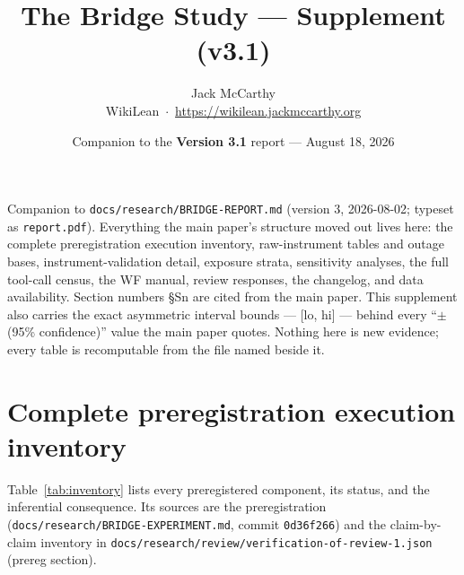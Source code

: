 \documentclass[10pt]{article}
\title{\textbf{The Bridge Study --- Supplement (v3.1)}}
\author{Jack McCarthy\\
\normalsize WikiLean \,$\cdot$\, \url{https://wikilean.jackmccarthy.org}}
\date{Companion to the \textbf{Version 3.1} report --- August 18, 2026}
\newcommand{\code}[1]{\texttt{#1}}
\begin{document}
\maketitle

\begin{center}
\begin{minipage}{0.92\textwidth}
\small
Companion to \code{docs/research/BRIDGE-REPORT.md} (version 3,
2026-08-02; typeset as \code{report.pdf}). Everything the main paper's
structure moved out lives here: the complete preregistration execution
inventory, raw-instrument tables and outage bases,
instrument-validation detail, exposure strata, sensitivity analyses,
the full tool-call census, the WF manual, review responses, the
changelog, and data availability. Section numbers \S Sn are cited from
the main paper. This supplement also carries the exact asymmetric
interval bounds --- [lo, hi] --- behind every ``$\pm$ (95\%
confidence)'' value the main paper quotes. Nothing here is new
evidence; every table is recomputable from the file named beside it.
\end{minipage}
\end{center}

\section{Complete preregistration execution inventory}\label{s1}

Table~\ref{tab:inventory} lists every preregistered component, its
status, and the inferential consequence. Its sources are the
preregistration (\code{docs/research/BRIDGE-EXPERIMENT.md}, commit
\code{0d36f266}) and the claim-by-claim inventory in
\code{docs/research/review/verification-of-review-1.json} (prereg
section).
\end{document}

